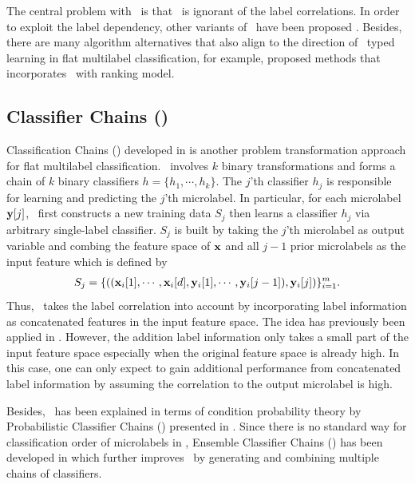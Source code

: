 {The central problem with \mlknn\ is that \mlknn\ is ignorant of the label correlations.
In order to exploit the label dependency, other variants of \mlknn\ have been proposed \citep{Cheng09combining,Younes11a}.
Besides, there are many algorithm alternatives that also align to the direction of \knn\ typed learning in flat multilabel classification, for example, \citet{Brinker07case,Chiang12a} proposed methods that incorporates \knn\ with ranking model.


%
%
\subsection{Classifier Chains (\cc)}

Classification Chains (\cc) developed in \citep{Read09classifier,Read11classifier} is another problem transformation approach for flat multilabel classification.
\cc\ involves $k$ binary transformations and forms a chain of $k$ binary classifiers $h=\{h_1,\cdots,h_k\}$.
The $j$'th classifier $h_j$ is responsible for learning and predicting the $j$'th microlabel.
In particular, for each microlabel $\mathbf {y}[j]$, \cc\ first constructs a new training data $S_j$ then learns a classifier $h_j$ via arbitrary single-label classifier.
$S_j$ is built by taking the $j$'th microlabel as output variable and combing the feature space of $\mathbf {x}$ and all $j-1$ prior microlabels as the input feature which is defined by
\begin{align*}
	S_j = \{((\mathbf {x}_i[1],\cdots,\mathbf {x}_i[d],\mathbf {y}_i[1],\cdots,\mathbf {y}_i[j-1]),\mathbf {y}_i[j])\}_{i=1}^{m}.
\end{align*} 
Thus, \cc\ takes the label correlation into account by incorporating label information as concatenated features in the input feature space.
The idea has previously been applied in \citep{Godbole04discriminative}.
However, the addition label information only takes a small part of the input feature space especially when the original feature space is already high.
In this case, one can only expect to gain additional performance from concatenated label information by assuming the correlation to the output microlabel is high.

Besides, \cc\ has been explained in terms of condition probability theory by Probabilistic Classifier Chains (\pcc) presented in \citep{Read09classifier,Dembczynski10bayes}.
Since there is no standard way for classification order of microlabels in \cc, Ensemble Classifier Chains (\ecc) has been developed in \citep{Read11classifier} which further improves \cc\ by generating and combining multiple chains of classifiers. 


}
